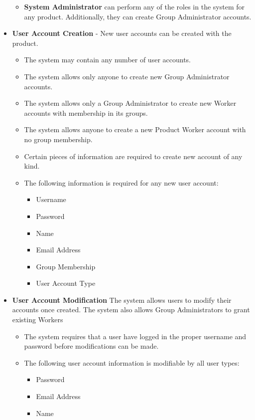 \documentclass{report}
\begin{document}
\begin{itemize}
\begin{itemize}
					\item \textbf{System Administrator} can perform any of the roles in the system for any product.
					Additionally, they can create Group Administrator 
				accounts.
				\end{itemize}

				\item \textbf{User Account Creation} - New user accounts can be 
				created with the product.
					\begin{itemize}
						\item The system may contain any number of user 
						accounts.
						\item The system allows only anyone to create new 
						Group Administrator accounts.
						\item The system allows only a Group Administrator to 
						create new Worker accounts with membership in 
						its groups.
						\item The system allows anyone to create a new Product 
						Worker account with no group membership.
						\item Certain pieces of information are required to 
						create new account of any kind.
						\item The following information is required for any new 
						user account:
							\begin{itemize}
								\item Username
								\item Password
								\item Name
								\item Email Address
								\item Group Membership
								\item User Account Type
							\end{itemize}	
				
					\end{itemize}
				\item \textbf{User Account Modification} The system allows users 
				to modify their accounts once created. The system also allows 
				Group Administrators to grant existing Workers 
				\begin{itemize}
					\item The system requires that a user have logged in the 
					proper username and password before modifications can be 
					made.
					\item The following user account information is modifiable 
					by all user types:
						\begin{itemize}
							\item Password
							\item Email Address
							\item Name
						\end{itemize}


\end{itemize}
\end{itemize}
\end{document}
